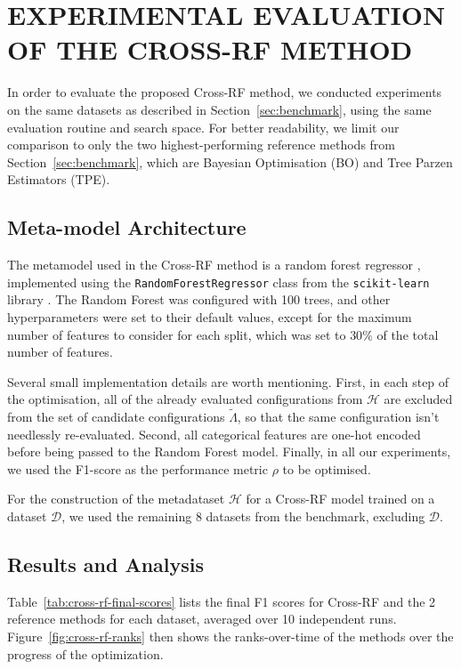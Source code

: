 \section{\uppercase{Experimental evaluation of the Cross-RF method}}
\label{sec:experimental-evaluation}

In order to evaluate the proposed Cross-RF method, we conducted experiments on the same datasets as described in Section~\ref{sec:benchmark}, using the same evaluation routine and search space. For better readability, we limit our comparison to only the two highest-performing reference methods from Section~\ref{sec:benchmark}, which are Bayesian Optimisation (BO) and Tree Parzen Estimators (TPE).

\subsection{Meta-model Architecture}

The metamodel used in the Cross-RF method is a random forest regressor \cite{breiman_random_2001}, implemented using the \texttt{RandomForestRegressor} class from the \texttt{scikit-learn} library \cite{pedregosa_scikit-learn_2011}. The Random Forest was configured with 100 trees, and other hyperparameters were set to their default values, except for the maximum number of features to consider for each split, which was set to \( 30\% \) of the total number of features.

Several small implementation details are worth mentioning. First, in each step of the optimisation, all of the already evaluated configurations from \( \mathcal{H} \) are excluded from the set of candidate configurations \( \tilde{\Lambda} \), so that the same configuration isn't needlessly re-evaluated. Second, all categorical features are one-hot encoded before being passed to the Random Forest model. Finally, in all our experiments, we used the F1-score as the performance metric \( \rho \) to be optimised.

For the construction of the metadataset \( \mathcal{H} \) for a Cross-RF model trained on a dataset \( \mathcal{D} \), we used the remaining 8 datasets from the benchmark, excluding \( \mathcal{D} \).

\subsection{Results and Analysis}
Table~\ref{tab:cross-rf-final-scores} lists the final F1 scores for Cross-RF and the 2 reference methods for each dataset, averaged over 10 independent runs. Figure~\ref{fig:cross-rf-ranks} then shows the ranks-over-time of the methods over the progress of the optimization.

